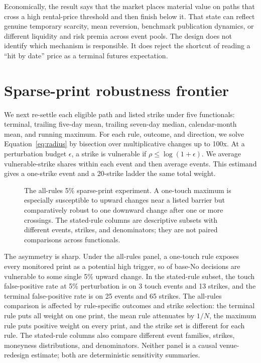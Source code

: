 \documentclass[10pt,twocolumn]{article}
\begin{document}
Economically, the result says that the market places material value on paths
that cross a high rental-price threshold and then finish below it. That state
can reflect genuine temporary scarcity, mean reversion, benchmark publication
dynamics, or different liquidity and risk premia across event pools. The design
does not identify which mechanism is responsible. It does reject the shortcut
of reading a ``hit by date'' price as a terminal futures expectation.

\section{Sparse-print robustness frontier}

We next re-settle each eligible path and listed strike under five functionals:
terminal, trailing five-day mean, trailing seven-day median, calendar-month
mean, and running maximum. For each rule, outcome, and direction, we solve
Equation~\eqref{eq:radius} by bisection over multiplicative changes up to 100x.
At a perturbation budget $\epsilon$, a strike is vulnerable if
$\rho\le\log(1+\epsilon)$. We average vulnerable-strike shares within each event
and then average events. This estimand gives a one-strike event and a 20-strike
ladder the same total weight.



\begin{figure}[t]
\centering

\caption{The all-rules 5\% sparse-print experiment. A one-touch maximum is
especially susceptible to upward changes near a listed barrier but
comparatively robust to one downward change after one or more crossings.
The stated-rule columns are descriptive subsets with different events, strikes,
and denominators; they are not paired comparisons across functionals.}
\label{fig:fragility}
\end{figure}

The asymmetry is sharp. Under the all-rules panel, a one-touch rule exposes
every monitored print as a potential high trigger, so \TouchFiveFPAll{} of
base-No decisions are vulnerable to some single 5\% upward change. In
the stated-rule subset, the touch
false-positive rate at 5\% perturbation is \TouchFiveFPActual{} on
3 touch events and 13 strikes, and the terminal false-positive rate is
\TerminalFiveFPActual{} on 25 events and 65 strikes. The all-rules comparison
is affected by rule-specific outcomes and strike selection: the terminal
rule puts all weight on one print, the mean rule attenuates by $1/N$, the
maximum rule puts positive weight on every print, and the strike set is
different for each rule. The stated-rule columns also compare different event
families, strikes, moneyness distributions, and denominators. Neither panel is
a causal venue-redesign estimate; both are deterministic sensitivity summaries.
\end{document}
